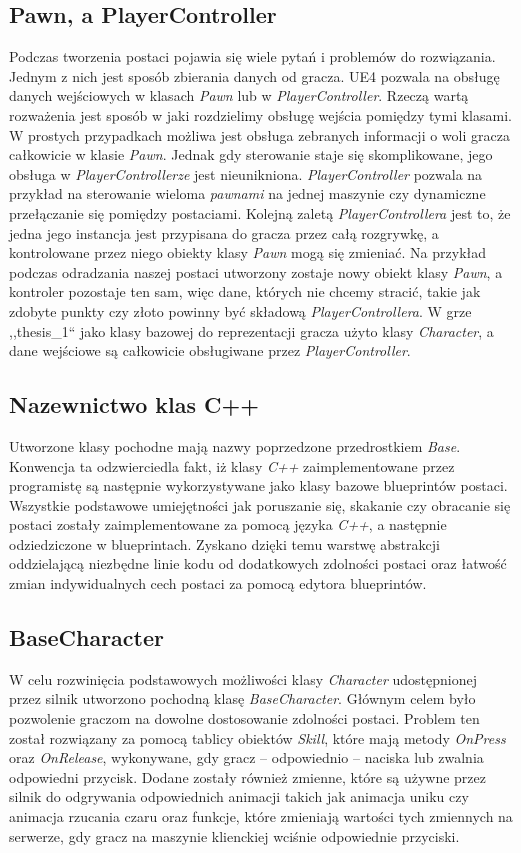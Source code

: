 \documentclass[multip]{SGGW-thesis}
\begin{document}
	\subsection{Pawn, a PlayerController}
	Podczas tworzenia postaci pojawia się wiele pytań i problemów do rozwiązania.
Jednym z nich jest sposób zbierania danych od gracza. UE4 pozwala na obsługę danych wejściowych w klasach {\em Pawn} lub w {\em PlayerController}. Rzeczą wartą rozważenia jest sposób w jaki rozdzielimy obsługę wejścia pomiędzy tymi klasami\cite{docs-playercontroller}. W prostych przypadkach możliwa jest obsługa zebranych informacji o woli gracza całkowicie w klasie  {\em Pawn}. Jednak gdy sterowanie staje się skomplikowane, jego obsługa w {\em PlayerControllerze} jest nieunikniona.  {\em PlayerController} pozwala na przykład na sterowanie wieloma  {\em pawnami} na jednej maszynie czy dynamiczne przełączanie się pomiędzy postaciami.  Kolejną zaletą  {\em PlayerControllera} jest to, że jedna jego instancja jest przypisana do gracza przez całą rozgrywkę, a kontrolowane przez niego obiekty klasy  {\em Pawn} mogą się zmieniać. Na przykład podczas odradzania naszej postaci utworzony zostaje nowy obiekt klasy  {\em Pawn}, a kontroler pozostaje ten sam, więc dane, których nie chcemy stracić, takie jak zdobyte punkty czy złoto powinny być składową  {\em PlayerControllera}.
\newline \indent W grze ,,thesis\_1`` jako klasy bazowej do reprezentacji gracza użyto klasy  {\em Character}, a dane wejściowe są całkowicie obsługiwane przez  {\em PlayerController}.
	\subsection{Nazewnictwo klas C++}
	Utworzone klasy pochodne mają nazwy poprzedzone przedrostkiem {\em Base}. Konwencja ta odzwierciedla fakt, iż klasy {\em C++} zaimplementowane przez programistę są następnie wykorzystywane jako klasy bazowe blueprintów postaci. Wszystkie podstawowe umiejętności jak poruszanie się, skakanie czy obracanie się postaci zostały zaimplementowane za pomocą języka  {\em C++}, a następnie odziedziczone w blueprintach. Zyskano dzięki temu warstwę abstrakcji oddzielającą niezbędne linie kodu od dodatkowych zdolności postaci oraz łatwość zmian indywidualnych cech postaci za pomocą edytora blueprintów.
	\subsection{BaseCharacter}
	W celu rozwinięcia podstawowych możliwości klasy  {\em Character} udostępnionej przez silnik utworzono pochodną klasę  {\em BaseCharacter}. Głównym celem było pozwolenie graczom na dowolne dostosowanie zdolności postaci. Problem ten został rozwiązany za pomocą tablicy obiektów  {\em Skill}, które mają metody  {\em OnPress} oraz  {\em OnRelease}, wykonywane, gdy gracz -- odpowiednio -- naciska lub zwalnia odpowiedni przycisk.		
Dodane zostały również zmienne, które są używne przez silnik do odgrywania odpowiednich animacji takich jak animacja uniku czy animacja rzucania czaru oraz funkcje, które zmieniają wartości tych zmiennych na serwerze, gdy gracz na maszynie klienckiej wciśnie odpowiednie przyciski.
\end{document}
